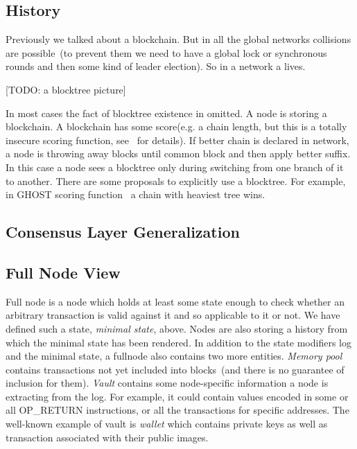 \documentclass[]{report}   %
\begin{document}
\subsection{History}

Previously we talked about a blockchain. But in all the global networks collisions are possible~(to prevent them we need to have a global lock or synchronous rounds and then some kind of leader election). So in a network a  lives.

[TODO: a blocktree picture]

In most cases the fact of blocktree existence in omitted. A node is storing a blockchain. A blockchain has some score(e.g. a chain length, but this is a totally insecure scoring function, see~\cite{stackexchange} for details). If better chain is declared in network, a node is throwing away blocks until common block and then apply better suffix. In this case a node sees a blocktree only during switching from one branch of it to another. There are some proposals to explicitly use a blocktree. For example, in GHOST scoring function~\cite{sompolinsky2015secure} a chain with heaviest tree wins. 


\subsection{Consensus Layer Generalization}

\subsection{Full Node View}

Full node is a node which holds at least some state enough to check whether an arbitrary transaction is valid against it and so applicable to it or not. We have defined such a state, \textit{minimal state}, above. Nodes are also storing a history from which the minimal state has been rendered. In addition to the state modifiers log and the minimal state, a fullnode also contains two more entities. \textit{Memory pool} contains transactions not yet included into blocks~(and there is no guarantee of inclusion for them). \textit{Vault} contains some node-specific information a node is extracting from the log. For example, it could contain values encoded in some or all OP\_RETURN instructions, or all the transactions for specific addresses. The well-known example of vault is \textit{wallet} which contains private keys as well as transaction associated with their public images.
\end{document}
